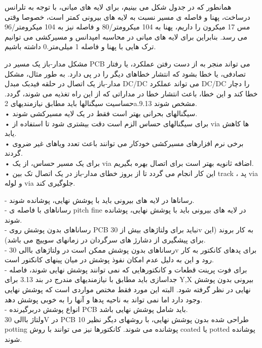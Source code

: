 همانطور که در جدول شکل  می بینیم، برای لایه های میانی، با توجه به تلرانس درساخت، پهنا و فاصله
ی مسیر نسبت به لایه های بیرونی کمتر است، خصوصا وقتی مس 17 میکرون را داریم، پهنا به
104 میکرومتر/80 و فاصله نیز به 104 میکرومتر/96 می رسد.
بنابراین برای لایه های میانی در محاسبه امپدانس و مسیرکشی می توانیم ترک هایی با پهنا و فاصله
1 میلی‌متر.0 داشته باشیم.


مشکل مدار-باز یک مسیر در PCB می تواند منجر به از دست رفتن عملکرد، یا رفتار تصادفی، یا
خطا بشود که انتشار خطاهای دیگر را در پی دارد. به طور مثال، مشکل مدار-باز یک اتصال در حلقه
فیدبک مبدل DC/DC می تواند عملکرد DC/DC را دچار خطا کند و این خطا، باعث انتشار خطا در
مداراتی که از این راه تغذیه می شوند، گردد.
حساسیت سیگنالها باید مطابق نیازمندیهای 2a.9.13 مشخص شوند.\\
• سیگنالهای بحرانی بهتر است فقط در یک لایه مسیرکشی شوند.\\
• برای سیگنالهای حساس الزم است دقت بیشتری شود تا استفاده از via ها کاهش یابد.\\
• برخی نرم افزارهای مسیرکشی خودکار می توانند باعث تعدد ویاهای غیر ضروی گردند.\\
• برای یک مسیر حساس، از یک via اضافه ثانویه بهتر است برای اتصال بهره بگیریم.\\
• این کار انجام می گردد تا از بروز خطای مدار-باز در یک اتصال تک بین track ، پد via و
لوله via جلوگیری کند.

- رساناها در لایه های بیرونی باید با پوشش نهایی، پوشانده شوند.\\
- رساناهای با فاصله ی pitch fine در لایه های بیرونی باید با پوشش نهایی، پوشانده
شوند.\\
- رساناهای بدون پوشش روی PCB نباید برای ولتاژهای بیش از 30v به کار بروند (این برای
پیشگیری از دشارژ های سرگردان در زمانهای سوییچ می باشد).\\
- رساناهای بدون پوشش ممکن است در ولتاژهای باالی 30v برای پدهای کانکتور به کار
رود و این به دلیل عدم امکان نفوذ پوشش در میان پینهای کانکتور است.\\
- برای فوت پرینت قطعات و کانکتورهایی که نمی توانند پوشش نهایی شوند، فاصله
جداسازی باید مطابق با نیازمندیهای مندرج در بند 3.13 برای Y,X بیرونی بدون پوشش
نهایی در نظر گرفته شود. البته این مورد فقط مختص مواردی است که پوشش نهایی
وجود دارد اما نمی تواند به ناحیه پدها و آنها را به خوبی پوشش دهد.\\
- انواع پوشش دربرگیرنده PCB باید شامل پوشش نهایی باشد. \\
ولتاژ باالی 30V در PCB طراحی شده بدون پوشش نهایی، با روشهای دیگر نظیر
10
potting
پوشانده می شوند. کانکتورها نیز می توانند با روش coated یا potted پوشانده شوند.

